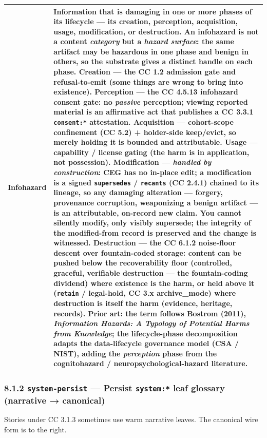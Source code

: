 \documentclass[11pt]{article}
\begin{document}
{\begin{longtable}{|p{8.0cm}|p{8.0cm}|}
\textbf{Infohazard} & Information that is \textbf{damaging in one or more phases of its lifecycle} — its \textbf{creation, perception, acquisition, usage, modification, or destruction}. An infohazard is not a content \textit{category} but a \textit{hazard surface}: the same artifact may be hazardous in one phase and benign in others, so the substrate gives a distinct handle on each phase. \textbf{Creation} — the CC 1.2 admission gate and refusal-to-emit (some things are wrong to bring into existence). \textbf{Perception} — the CC 4.5.13 infohazard consent gate: no \textit{passive} perception; viewing reported material is an affirmative act that publishes a CC 3.3.1 \texttt{consent:*} attestation. \textbf{Acquisition} — cohort-scope confinement (CC 5.2) + holder-side keep/evict, so merely holding it is bounded and attributable. \textbf{Usage} — capability / license gating (the harm is in application, not possession). \textbf{Modification} — \textit{handled by construction}: CEG has \textbf{no in-place edit}; a modification is a signed \texttt{supersedes} / \texttt{recants} (CC 2.4.1) chained to its lineage, so any damaging alteration — forgery, provenance corruption, weaponizing a benign artifact — is an \textbf{attributable, on-record new claim}. You cannot silently modify, only visibly supersede; the integrity of the modified-from record is preserved and the change is witnessed. \textbf{Destruction} — the CC 6.1.2 noise-floor descent over fountain-coded storage: content can be \textbf{pushed below the recoverability floor} (controlled, graceful, verifiable destruction — the fountain-coding dividend) where existence is the harm, or \textbf{held above it} (\texttt{retain} / legal-hold, CC 3.x archive\_mode) where destruction is itself the harm (evidence, heritage, records). \textbf{Prior art:} the term follows Bostrom (2011), \textit{Information Hazards: A Typology of Potential Harms from Knowledge}; the lifecycle-phase decomposition adapts the data-lifecycle governance model (CSA / NIST), adding the \textit{perception} phase from the cognitohazard / neuropsychological-hazard literature. \\ \hline
\end{longtable}}


\subsubsection*{8.1.2 \texttt{system-persist} — Persist \texttt{system:*} leaf glossary (narrative → canonical)}


Stories under CC 3.1.3 sometimes use warm narrative leaves. The canonical wire form is to the right.
\end{document}
